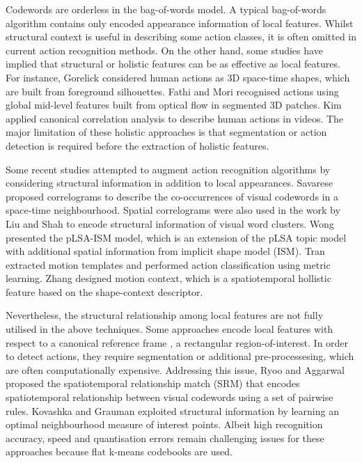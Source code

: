 Codewords are orderless in the bag-of-words model. 
A typical bag-of-words algorithm contains only encoded appearance information of local features.  
Whilst structural context is useful in describing some action classes, it is often omitted in current action recognition methods.
On the other hand, some studies have implied that structural or holistic features can be as effective as local features. 
For instance, Gorelick \etal \cite{Gorelick2007} considered human actions as 3D space-time shapes, which are built from foreground silhouettes. Fathi and Mori \cite{Fathi2008} recognised actions using global mid-level features built from optical flow in segmented 3D patches. Kim \etal \cite{Kim2007} applied canonical correlation analysis to describe human actions in videos. The major limitation of these holistic approaches is that segmentation or action detection is required before the extraction of holistic features.  

Some recent studies attempted to augment action recognition algorithms by considering structural information in addition to local appearances. Savarese \etal \cite{Savarese2008} proposed correlograms to describe the co-occurrences of visual codewords in a space-time neighbourhood. Spatial correlograms were also used in the work by Liu and Shah \cite{Liu2008} to encode structural information of visual word clusters. Wong \etal \cite{Wong2007} presented the pLSA-ISM model, which is an extension of the pLSA topic model \cite{Fergus2005} with additional spatial information from implicit shape model (ISM). Tran \etal \cite{Tran2008} extracted motion templates and performed action classification using metric learning. Zhang \etal \cite{Zhang2008} designed motion context, which is a spatiotemporal hollistic feature based on the shape-context descriptor.  

Nevertheless, the structural relationship among local features are not fully utilised in the above techniques. Some approaches encode local features with respect to a canonical reference frame \cite{Wong2007, Tran2008, Zhang2008}, \eg a rectangular region-of-interest. In order to detect actions, they require segmentation or additional pre-processesing, which are often computationally expensive. Addressing this issue, Ryoo and Aggarwal \cite{Ryoo2009} proposed the spatiotemporal relationship match (SRM) that encodes spatiotemporal relationship between visual codewords using a set of pairwise rules. Kovashka and Grauman \cite{Kovashka2010} exploited structural information by learning an optimal neighbourhood measure of interest points. Albeit high recognition accuracy, speed and quantisation errors remain challenging issues for these approaches because flat k-means codebooks are used.   

